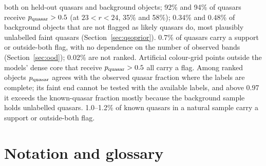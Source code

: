 \documentclass[11pt,a4paper]{article}
\begin{document}
\begin{itemize}
  both on held-out quasars and background objects; 92\% and 94\% of quasars receive $p_{\rm quasar}>0.5$ (at
  $23<r<24$, 35\% and 58\%); 0.34\% and 0.48\% of background objects that are not flagged as likely quasars do,
  most plausibly unlabelled faint quasars (Section~\ref{sec:qsoprior}). 0.7\% of quasars carry a support or
  outside-both flag, with no dependence on the number of observed bands (Section~\ref{sec:ood}); 0.02\% are not
  ranked. Artificial colour-grid points outside the models' dense core that receive $p_{\rm quasar}>0.5$ all carry
  a flag. Among ranked objects $p_{\rm quasar}$ agrees with the observed quasar
  fraction where the labels are complete; its faint end cannot be tested with the available labels, and above 0.97
  it exceeds the known-quasar fraction mostly because the background sample holds unlabelled quasars.
  1.0--1.2\% of known quasars in a natural sample carry a support or outside-both flag.
\end{itemize}

\section{Notation and glossary}\label{sec:notation}
\end{document}
